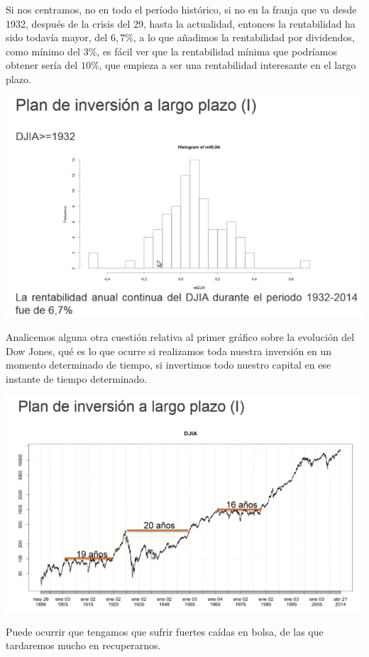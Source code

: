 Si nos centramos, no en todo el período histórico, si no en la franja que va desde 1932, después de la crisis del 29, hasta la actualidad, entonces la rentabilidad ha sido todavía mayor, del $6,7\%$, a lo que añadimos la rentabilidad por dividendos, como mínimo del $3\%$, es fácil ver que la rentabilidad mínima que podríamos obtener sería del $10\%$, que empieza a ser una rentabilidad interesante en el largo plazo.
\begin{center}
    \includegraphics[scale=.65]{images/mod03-03.png}
\end{center}

Analicemos alguna otra cuestión relativa al primer gráfico sobre la evolución del Dow Jones, qué es lo que ocurre si realizamos toda nuestra inversión en un momento determinado de tiempo, si invertimos todo nuestro capital en ese instante de tiempo determinado.
\begin{center}
    \includegraphics[scale=.65]{images/mod03-04.png}
\end{center}
Puede ocurrir que tengamos que sufrir fuertes caídas en bolsa, de las que tardaremos mucho en recuperarnos. 

